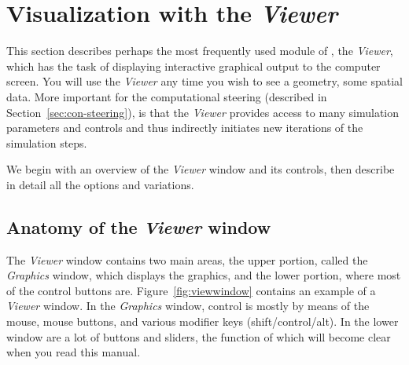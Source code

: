 %
%
  \newcommand{\viewerwindow}%
  {\centerline{\epsfig{file=figures/viewwindow.eps,width=\columnwidth}}}
\begin{htmlonly}
  \newcommand{\viewerwindow}{%
  \htmladdimg[align=top,width=8,alt="module"]
  {../figures/viewwindow.gif}}
\end{htmlonly}

  \newcommand{\extendedwindow}%
  {\centerline{\epsfig{file=figures/ext-viewwindow.eps,width=\columnwidth}}}
\begin{htmlonly}
  \newcommand{\extendedwindow}{%
  \htmladdimg[align=top,width=8,alt="module"]
  {../figures/ext-viewwindow.gif}}
\end{htmlonly}
\newcommand{\viewer}{\emph{Viewer}}
\newcommand{\graphics}{\emph{Graphics}}

\section{Visualization with the \viewer{}}
\label{sec:viewerer}

This section describes perhaps the most frequently used module of \SR{},
the \viewer{}, which has the task of displaying interactive graphical output
to the computer screen.  You will use the \viewer{} any time you wish to see
a geometry, some spatial data.  More important for the computational
steering (described in Section~\ref{sec:con-steering}), is that the \viewer{}
provides access to many simulation parameters and controls and thus
indirectly initiates new iterations of the simulation steps.

We begin with an overview of the \viewer{} window and its controls, then
describe in detail all the options and variations.

\subsection{Anatomy of the \viewer{} window}
\label{sec:viewer-anatomy} 

The \viewer{} window contains two main areas, the upper portion, called the
\graphics{} window, which displays the graphics, and the lower portion,
where most of the control buttons are.  Figure~\ref{fig:viewwindow}
contains an example of a \viewer{} window. In the \graphics{}
window, control is mostly by means of the mouse, mouse buttons, and various
modifier keys (shift/control/alt).  In the lower window are a lot of
buttons and sliders, the function of which will become clear when you read
this manual.

